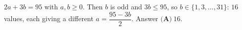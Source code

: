 $2a+3b=95$ with $a,b\ge0$. Then $b$ is odd and $3b\le95$, so $b\in\{1,3,\dots,31\}$: $16$ values, each giving a different $a=\dfrac{95-3b}2$. Answer $\boxed{\textbf{(A)}\ 16}$.
